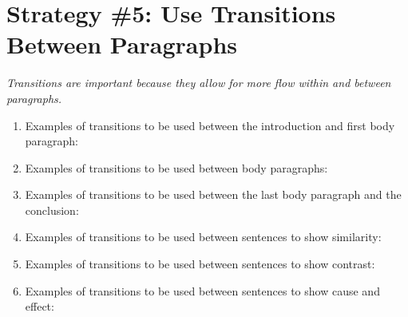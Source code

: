 \section{Strategy \#5: Use Transitions Between Paragraphs}

\textit{Transitions are important because they allow for more flow within and between paragraphs.}

\begin{enumerate}
\item Examples of transitions to be used between the introduction and first body paragraph:
\vfill\item Examples of transitions to be used between body paragraphs:
\vfill\item Examples of transitions to be used between the last body paragraph and the conclusion:
\vfill\item  Examples of transitions to be used between sentences to show similarity:
\vfill\item Examples of transitions to be used between sentences to show contrast:
\vfill\item Examples of transitions to be used between sentences to show cause and effect:
\vfill
\end{enumerate}
